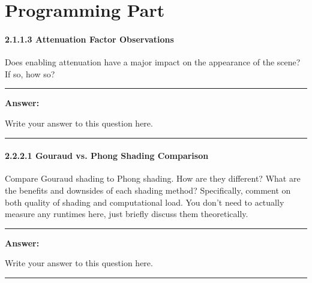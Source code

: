 \documentclass[conference]{styles/acmsiggraph}
\newcommand\subsubsubsection{\paragraph}
\newenvironment{answer}{}{}
\begin{document}
\newpage

\section{Programming Part}

\subsubsubsection*{2.1.1.3 Attenuation Factor Observations} \label{sec:attenuation_factor_comparison}
Does enabling attenuation have a major impact on the appearance of the scene? If so, how so?

\begin{answer}
\rule{\textwidth}{0.4pt}
	
	\textbf{Answer:}
	
	Write your answer to this question here.

\rule{\textwidth}{0.4pt}
\end{answer}

\subsubsubsection* {2.2.2.1 Gouraud vs. Phong Shading Comparison} \label{sec:gouraud_vs_phong_comparison}

Compare Gouraud shading to Phong shading. How are they different? What are the benefits and downsides of each shading method? Specifically, comment on both quality of shading and computational load. You don't need to actually measure any runtimes here, just briefly discuss them theoretically.


\begin{answer}
\rule{\textwidth}{0.4pt}
	
	\textbf{Answer:}
	
	Write your answer to this question here.

\rule{\textwidth}{0.4pt}
\end{answer}
\end{document}
